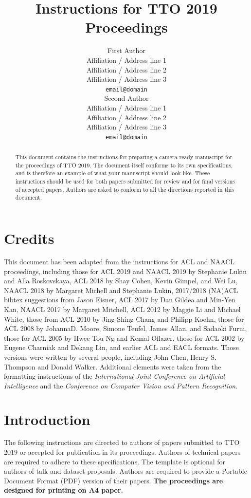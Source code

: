 \documentclass[11pt,a4paper]{article}
\title{Instructions for TTO 2019 Proceedings}
\author{First Author \\
  Affiliation / Address line 1 \\
  Affiliation / Address line 2 \\
  Affiliation / Address line 3 \\
  \texttt{email@domain} \\\And
  Second Author \\
  Affiliation / Address line 1 \\
  Affiliation / Address line 2 \\
  Affiliation / Address line 3 \\
  \texttt{email@domain} \\}
\date{}
\begin{document}
\maketitle
\begin{abstract}
  This document contains the instructions for preparing a camera-ready
  manuscript for the proceedings of TTO 2019. The document itself
  conforms to its own specifications, and is therefore an example of
  what your manuscript should look like. These instructions should be
  used for both papers submitted for review and for final versions of
  accepted papers.  Authors are asked to conform to all the directions
  reported in this document.
\end{abstract}

\section{Credits}

This document has been adapted from the instructions
for ACL and NAACL proceedings,
including 
those for
ACL 2019 and
NAACL 2019 by Stephanie Lukin and Alla Roskovskaya, 
ACL 2018 by Shay Cohen, Kevin Gimpel, and Wei Lu, 
NAACL 2018 by Margaret Michell and Stephanie Lukin,
2017/2018 (NA)ACL bibtex suggestions from Jason Eisner,
ACL 2017 by Dan Gildea and Min-Yen Kan, 
NAACL 2017 by Margaret Mitchell, 
ACL 2012 by Maggie Li and Michael White, 
those from ACL 2010 by Jing-Shing Chang and Philipp Koehn, 
those for ACL 2008 by JohannaD. Moore, Simone Teufel, James Allan, and Sadaoki Furui, 
those for ACL 2005 by Hwee Tou Ng and Kemal Oflazer, 
those for ACL 2002 by Eugene Charniak and Dekang Lin, 
and earlier ACL and EACL formats.
Those versions were written by several
people, including John Chen, Henry S. Thompson and Donald
Walker. Additional elements were taken from the formatting
instructions of the \emph{International Joint Conference on Artificial
  Intelligence} and the \emph{Conference on Computer Vision and
  Pattern Recognition}.

\section{Introduction}

The following instructions are directed to authors of papers submitted
to TTO 2019 or accepted for publication in its proceedings. Authors of technical papers
are required to adhere to these specifications. The template is optional for 
authors of talk and dataset proposals. Authors are
required to provide a Portable Document Format (PDF) version of their
papers. \textbf{The proceedings are designed for printing on A4
paper.}
\end{document}
